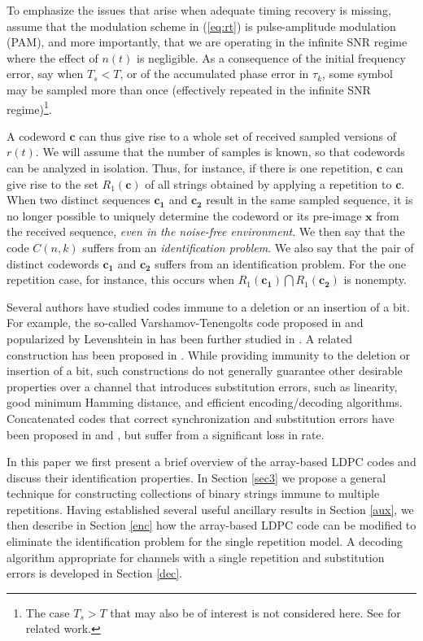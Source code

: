 To emphasize the issues that arise when adequate timing recovery
is missing, assume that the modulation scheme in (\ref{eq:rt}) is
pulse-amplitude modulation (PAM), and more importantly, that we
are operating in the infinite SNR regime where the effect of
$n(t)$ is negligible. As a consequence of the initial frequency
error, say when $T_s < T$, or of the accumulated phase error in
$\tau_k$, some symbol may be sampled more than once (effectively
repeated in the infinite SNR regime)\footnote{The case $T_s>T$
that may also be of interest is not considered here. See
\cite{techRM:06} for related work.}.

A codeword $\mathbf{c}$ can thus give rise to a whole set of
received sampled versions of $r(t)$. We will assume that the
number of samples is known, so that codewords can be analyzed in
isolation. Thus, for instance, if there is one repetition,
$\mathbf{c}$ can give rise to the set $R_1(\mathbf{c})$ of all
strings obtained by applying a repetition to $\mathbf{c}$. When
two distinct sequences $\mathbf{c_1}$ and $\mathbf{c_2}$ result in
the same sampled sequence, it is no longer possible to uniquely
determine the codeword or its pre-image $\mathbf{x}$ from the
received sequence, \textit{even in the noise-free environment}. We
then say that the code $C(n,k)$ suffers from an
\textit{identification problem}. We also say that the pair of
distinct codewords $\mathbf{c_1}$ and $\mathbf{c_2}$ suffers from
an identification problem. For the one repetition case, for
instance, this occurs when $R_1(\mathbf{c_1}) \bigcap
R_1(\mathbf{c_2})$ is nonempty.

Several authors have studied codes immune to a deletion or an
insertion of a bit. For example, the so-called
Varshamov-Tenengolts code proposed in \cite{vt:65} and popularized
by Levenshtein in \cite{lev:66} has been further studied in
\cite{sloane:00}. A related construction has been proposed in
\cite{klove:95}. While providing immunity to the deletion or
insertion of a bit, such constructions do not generally guarantee
other desirable properties over a channel that introduces
substitution errors, such as linearity, good minimum Hamming
distance, and efficient encoding/decoding algorithms. Concatenated
codes that correct synchronization and substitution errors have
been proposed in \cite{cmnv:03} and \cite{dmackay:01}, but suffer
from a significant loss in rate.

In this paper we first present a brief overview of the array-based
LDPC codes and discuss their identification properties. In Section
\ref{sec3} we propose a general technique for constructing
collections of binary strings immune to multiple repetitions.
Having established several useful ancillary results in Section
\ref{aux}, we then describe in Section \ref{enc} how the
array-based LDPC code can be modified to eliminate the
identification problem for the single repetition model. A decoding
algorithm appropriate for channels with a single repetition and
substitution
errors is developed in Section \ref{dec}. %
